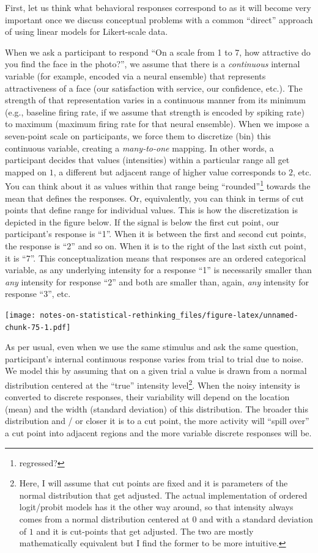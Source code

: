 \documentclass[
]{book}
\begin{document}
First, let us think what behavioral responses correspond to as it will become very important once we discuss conceptual problems with a common ``direct'' approach of using linear models for Likert-scale data.

When we ask a participant to respond ``On a scale from 1 to 7, how attractive do you find the face in the photo?'', we assume that there is a \emph{continuous} internal variable (for example, encoded via a neural ensemble) that represents attractiveness of a face (our satisfaction with service, our confidence, etc.). The strength of that representation varies in a continuous manner from its minimum (e.g., baseline firing rate, if we assume that strength is encoded by spiking rate) to maximum (maximum firing rate for that neural ensemble). When we impose a seven-point scale on participants, we force them to discretize (bin) this continuous variable, creating a \emph{many-to-one} mapping. In other words, a participant decides that values (intensities) within a particular range all get mapped on \(1\), a different but adjacent range of higher value corresponds to \(2\), etc. You can think about it as values within that range being ``rounded''\footnote{regressed?} towards the mean that defines the responses. Or, equivalently, you can think in terms of cut points that define range for individual values. This is how the discretization is depicted in the figure below. If the signal is below the first cut point, our participant's response is ``1''. When it is between the first and second cut points, the response is ``2'' and so on. When it is to the right of the last sixth cut point, it is ``7''. This conceptualization means that responses are an ordered categorical variable, as any underlying intensity for a response ``1'' is necessarily smaller than \emph{any} intensity for response ``2'' and both are smaller than, again, \emph{any} intensity for response ``3'', etc.

\texttt{[image: notes-on-statistical-rethinking\_files/figure-latex/unnamed-chunk-75-1.pdf]}

As per usual, even when we use the same stimulus and ask the same question, participant's internal continuous response varies from trial to trial due to noise. We model this by assuming that on a given trial a value is drawn from a normal distribution centered at the ``true'' intensity level\footnote{Here, I will assume that cut points are fixed and it is parameters of the normal distribution that get adjusted. The actual implementation of ordered logit/probit models has it the other way around, so that intensity always comes from a normal distribution centered at \(0\) and with a standard deviation of \(1\) and it is cut-points that get adjusted. The two are mostly mathematically equivalent but I find the former to be more intuitive.}. When the noisy intensity is converted to discrete responses, their variability will depend on the location (mean) and the width (standard deviation) of this distribution. The broader this distribution and / or closer it is to a cut point, the more activity will ``spill over'' a cut point into adjacent regions and the more variable discrete responses will be.
\end{document}
